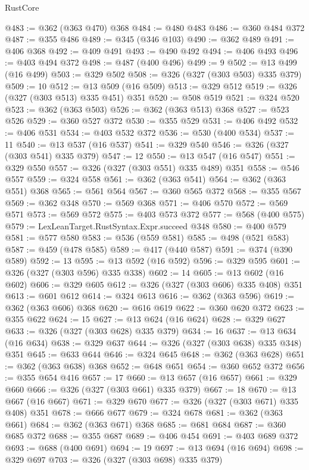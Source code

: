 \begin{lexlean}{RustCore}
\begin{coremodule}
@483 := @362 (@363 @470) @368
@484 := @480 @483
@486 := @360 @484 @372
@487 := @355 @486
@489 := @345 (@346 @103)
@490 := @362 @489
@491 := @406 @368
@492 := @409 @491
@493 := @490 @492
@494 := @406 @493
@496 := @403 @494 @372
@498 := @487 (@400 @496)
@499 := 9
@502 := @13 @499 (@16 @499)
@503 := @329 @502
@508 := @326 (@327 (@303 @503) @335 @379)
@509 := 10
@512 := @13 @509 (@16 @509)
@513 := @329 @512
@519 := @326 (@327 (@303 @513) @335 @451) @351
@520 := @508 @519
@521 := @324 @520
@523 := @362 (@363 @503)
@526 := @362 (@363 @513) @368
@527 := @523 @526
@529 := @360 @527 @372
@530 := @355 @529
@531 := @406 @492
@532 := @406 @531
@534 := @403 @532 @372
@536 := @530 (@400 @534)
@537 := 11
@540 := @13 @537 (@16 @537)
@541 := @329 @540
@546 := @326 (@327 (@303 @541) @335 @379)
@547 := 12
@550 := @13 @547 (@16 @547)
@551 := @329 @550
@557 := @326 (@327 (@303 @551) @335 @489) @351
@558 := @546 @557
@559 := @324 @558
@561 := @362 (@363 @541)
@564 := @362 (@363 @551) @368
@565 := @561 @564
@567 := @360 @565 @372
@568 := @355 @567
@569 := @362 @348
@570 := @569 @368
@571 := @406 @570
@572 := @569 @571
@573 := @569 @572
@575 := @403 @573 @372
@577 := @568 (@400 @575)
@579 := LexLeanTarget.RustSyntax.Expr.succeed @348
@580 := @400 @579
@581 := @577 @580
@583 := @536 (@559 @581)
@585 := @498 (@521 @583)
@587 := @459 (@478 @585)
@589 := @417 (@440 @587)
@591 := @374 (@390 @589)
@592 := 13
@595 := @13 @592 (@16 @592)
@596 := @329 @595
@601 := @326 (@327 (@303 @596) @335 @338)
@602 := 14
@605 := @13 @602 (@16 @602)
@606 := @329 @605
@612 := @326 (@327 (@303 @606) @335 @408) @351
@613 := @601 @612
@614 := @324 @613
@616 := @362 (@363 @596)
@619 := @362 (@363 @606) @368
@620 := @616 @619
@622 := @360 @620 @372
@623 := @355 @622
@624 := 15
@627 := @13 @624 (@16 @624)
@628 := @329 @627
@633 := @326 (@327 (@303 @628) @335 @379)
@634 := 16
@637 := @13 @634 (@16 @634)
@638 := @329 @637
@644 := @326 (@327 (@303 @638) @335 @348) @351
@645 := @633 @644
@646 := @324 @645
@648 := @362 (@363 @628)
@651 := @362 (@363 @638) @368
@652 := @648 @651
@654 := @360 @652 @372
@656 := @355 @654 @416
@657 := 17
@660 := @13 @657 (@16 @657)
@661 := @329 @660
@666 := @326 (@327 (@303 @661) @335 @379)
@667 := 18
@670 := @13 @667 (@16 @667)
@671 := @329 @670
@677 := @326 (@327 (@303 @671) @335 @408) @351
@678 := @666 @677
@679 := @324 @678
@681 := @362 (@363 @661)
@684 := @362 (@363 @671) @368
@685 := @681 @684
@687 := @360 @685 @372
@688 := @355 @687
@689 := @406 @454
@691 := @403 @689 @372
@693 := @688 (@400 @691)
@694 := 19
@697 := @13 @694 (@16 @694)
@698 := @329 @697
@703 := @326 (@327 (@303 @698) @335 @379)

\end{coremodule}
\end{lexlean}
